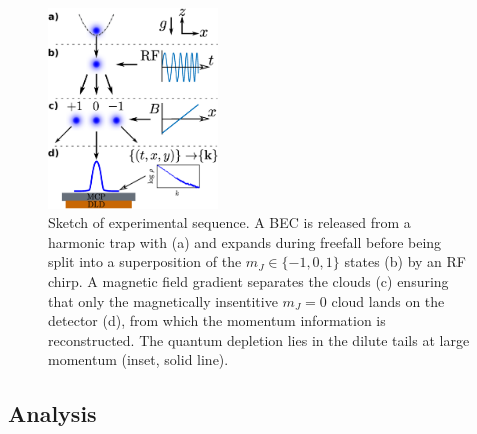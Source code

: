	


	\begin{figure}[t]
	    \includegraphics[width=0.4\textwidth]{fig/depletion/exp_cartoon}
	    \caption{Sketch of experimental sequence. A BEC is released from a harmonic trap with (a) and expands during freefall before being split into a superposition of the $m_J\in\{-1,0,1\}$ states (b) by an RF chirp. A magnetic field gradient separates the clouds (c) ensuring that only the magnetically insentitive $m_J=0$ cloud lands on the detector (d), from which the momentum information is reconstructed. The quantum depletion lies in the dilute tails at large momentum (inset, solid line).}
	    \label{fig:sequence}
	\end{figure}

	


\subsection{Analysis} 

